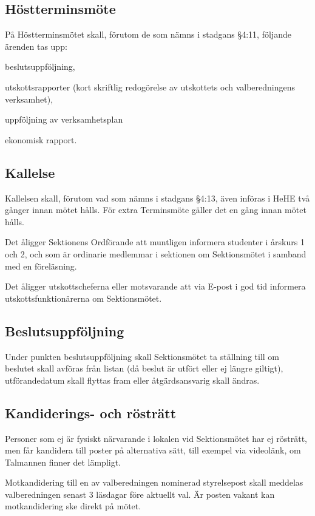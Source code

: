 \documentclass[10pt]{article}
\begin{document}
\subsection{Höstterminsmöte}
På Höstterminsmötet skall, förutom de som nämns i stadgans §4:11,
följande ärenden tas upp:
\begin{alphlist}
    \item beslutsuppföljning,
    \item utskottsrapporter (kort skriftlig redogörelse av utskottets och valberedningens verksamhet),
   	\item uppföljning av verksamhetsplan
    \item ekonomisk rapport.
\end{alphlist}

\subsection{Kallelse}
Kallelsen skall, förutom vad som nämns i stadgans §4:13, även införas i
HeHE två gånger innan mötet hålls. För extra Terminsmöte gäller det en
gång innan mötet hålls.

Det åligger Sektionens Ordförande att muntligen informera studenter i årskurs 1 och 2, och som är ordinarie medlemmar i sektionen om
Sektionsmötet i samband med en föreläsning.

Det åligger utskottscheferna eller motsvarande att via E-post i god tid
informera utskottsfunktionärerna om Sektionsmötet.

\subsection{Beslutsuppföljning}
Under punkten beslutsuppföljning skall Sektionsmötet ta ställning till om
beslutet skall avföras från listan (då beslut är utfört eller ej längre
giltigt), utförandedatum skall flyttas fram eller åtgärdsansvarig skall ändras.
\subsection{Kandiderings- och rösträtt}
Personer som ej är fysiskt närvarande i lokalen vid Sektionsmötet har ej rösträtt, men får kandidera till poster på alternativa sätt, till exempel via videolänk, om Talmannen finner det lämpligt.

Motkandidering till en av valberedningen nominerad styrelsepost skall meddelas valberedningen senast 3 läsdagar före aktuellt val. Är posten vakant kan motkandidering ske direkt på mötet.
\end{document}
